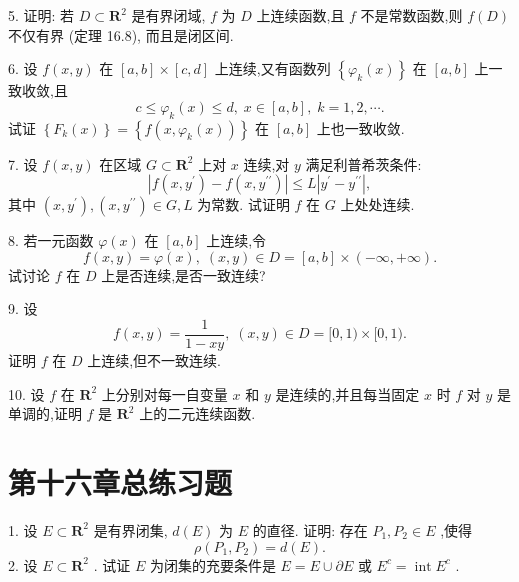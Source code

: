 5. 证明: 若 \(D \subset  {\mathbf{R}}^{2}\) 是有界闭域, \(f\) 为 \(D\) 上连续函数,且 \(f\) 不是常数函数,则 \(f\left( D\right)\) 不仅有界 (定理 16.8), 而且是闭区间.

6. 设 \(f\left( {x,y}\right)\) 在 \(\left\lbrack  {a,b}\right\rbrack   \times  \left\lbrack  {c,d}\right\rbrack\) 上连续,又有函数列 \(\left\{  {{\varphi }_{k}\left( x\right) }\right\}\) 在 \(\left\lbrack  {a,b}\right\rbrack\) 上一致收敛,且
\[
c \leq  {\varphi }_{k}\left( x\right)  \leq  d,\;x \in  \left\lbrack  {a,b}\right\rbrack  ,\;k = 1,2,\cdots .
\]
试证 \(\left\{  {{F}_{k}\left( x\right) }\right\}   = \left\{  {f\left( {x,{\varphi }_{k}\left( x\right) }\right) }\right\}\) 在 \(\left\lbrack  {a,b}\right\rbrack\) 上也一致收敛.

7. 设 \(f\left( {x,y}\right)\) 在区域 \(G \subset  {\mathbf{R}}^{2}\) 上对 \(x\) 连续,对 \(y\) 满足利普希茨条件:
\[
\left| {f\left( {x,{y}^{\prime }}\right)  - f\left( {x,{y}^{\prime \prime }}\right) }\right|  \leq  L\left| {{y}^{\prime } - {y}^{\prime \prime }}\right| ,
\]
其中 \(\left( {x,{y}^{\prime }}\right) ,\left( {x,{y}^{\prime \prime }}\right)  \in  G,L\) 为常数. 试证明 \(f\) 在 \(G\) 上处处连续.

8. 若一元函数 \(\varphi \left( x\right)\) 在 \(\left\lbrack  {a,b}\right\rbrack\) 上连续,令
\[
f\left( {x,y}\right)  = \varphi \left( x\right) ,\;\left( {x,y}\right)  \in  D = \left\lbrack  {a,b}\right\rbrack   \times  \left( {-\infty , + \infty }\right) .
\]
试讨论 \(f\) 在 \(D\) 上是否连续,是否一致连续?

9. 设
\[
f\left( {x,y}\right)  = \frac{1}{1 - {xy}},\;\left( {x,y}\right)  \in  D = \lbrack 0,1) \times  \lbrack 0,1).
\]
证明 \(f\) 在 \(D\) 上连续,但不一致连续.

10. 设 \(f\) 在 \({\mathbf{R}}^{2}\) 上分别对每一自变量 \(x\) 和 \(y\) 是连续的,并且每当固定 \(x\) 时 \(f\) 对 \(y\) 是单调的,证明 \(f\) 是 \({\mathbf{R}}^{2}\) 上的二元连续函数.

\section{第十六章总练习题}

1. 设 \(E \subset  {\mathbf{R}}^{2}\) 是有界闭集, \(d\left( E\right)\) 为 \(E\) 的直径. 证明: 存在 \({P}_{1},{P}_{2} \in  E\) ,使得
\[
\rho \left( {{P}_{1},{P}_{2}}\right)  = d\left( E\right) .
\]
2. 设 \(E \subset  {\mathbf{R}}^{2}\) . 试证 \(E\) 为闭集的充要条件是 \(E = E \cup  \partial E\) 或 \({E}^{c} = \operatorname{int}{E}^{c}\) .

